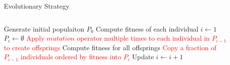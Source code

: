\documentclass{beamer}
\begin{document}
\begin{frame}{Evolutionary Strategy}
    \begin{columns}
        \begin{column}{0.66\linewidth}
            \begin{spacing}{1.2}
            \fontsize{8}{12}\selectfont
            \setlength{\interspacetitleruled}{0pt}%
            \setlength{\algotitleheightrule}{0pt}%
            \begin{algorithm}[H]
                Generate initial populaiton $P_0$\;
                Compute fitness of each individual\;
                $i \leftarrow 1$ \;
                 {
                    $P_i \leftarrow \emptyset$ \;
                    \textcolor{red}{Apply $mutation$ operator multiple times to each individual in $P_{i-1}$ to create offsprings} \;
                    Compute fitness for all offsprings \;
                    \textcolor{red}{Copy a fraction of $P_{i-1}$ individuals ordered by fitness into $P_i$} \;
                    Update $i \leftarrow i+1$
                }
            \end{algorithm}
        \end{spacing}
        \end{column}
        \begin{column}{0.3\linewidth}
                \begin{figure}
                \end{figure}
        \end{column}
    \end{columns}
    \vspace*{-.2cm}
\end{frame}
\end{document}
